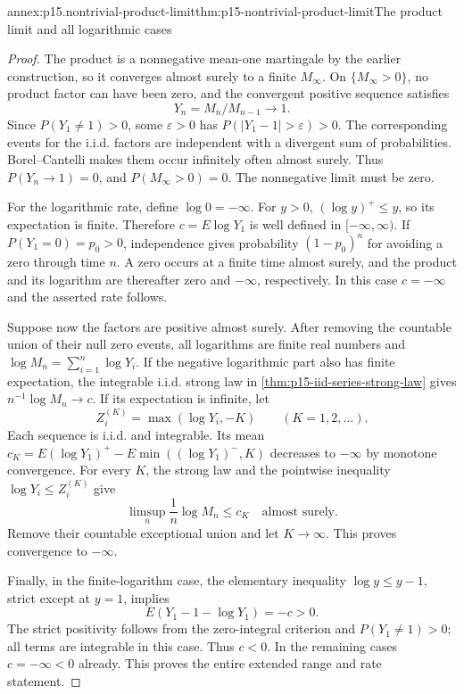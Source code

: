\begin{annexitem}{annex:p15.nontrivial-product-limit}{thm:p15-nontrivial-product-limit}{The product limit and all logarithmic cases}
\begin{proof}
The product is a nonnegative mean-one martingale by the earlier
construction, so it converges almost surely to a finite \(M_\infty\).
On \(\{M_\infty>0\}\), no product factor can have been zero,
and the convergent positive sequence satisfies
\[
                          Y_n=M_n/M_{n-1}\longrightarrow1.
\]
Since \(P(Y_1\ne1)>0\), some \(\varepsilon>0\) has
\(P(|Y_1-1|>\varepsilon)>0\).
The corresponding events for the i.i.d. factors are independent
with a divergent sum of probabilities.
Borel--Cantelli makes them occur infinitely often almost surely.
Thus \(P(Y_n\to1)=0\), and \(P(M_\infty>0)=0\).
The nonnegative limit must be zero.

For the logarithmic rate, define \(\log0=-\infty\).
For \(y>0\), \((\log y)^+\leq y\), so its expectation is finite.
Therefore \(c=E\log Y_1\) is well defined in \([-\infty,\infty)\).
If \(P(Y_1=0)=p_0>0\), independence gives probability
\((1-p_0)^n\) for avoiding a zero through time \(n\).
A zero occurs at a finite time almost surely, and the product
and its logarithm are thereafter zero and \(-\infty\), respectively.
In this case \(c=-\infty\) and the asserted rate follows.

Suppose now the factors are positive almost surely.
After removing the countable union of their null zero events,
all logarithms are finite real numbers and
\(\log M_n=\sum_{i=1}^n\log Y_i\).
If the negative logarithmic part also has finite expectation,
the integrable i.i.d. strong law in \cref{thm:p15-iid-series-strong-law} gives
\(n^{-1}\log M_n\to c\).
If its expectation is infinite, let
\[
                         Z_i^{(K)}=\max(\log Y_i,-K)
                                           \qquad(K=1,2,\ldots).
\]
Each sequence is i.i.d. and integrable.
Its mean \(c_K=E(\log Y_1)^+-E\min((\log Y_1)^-,K)\)
decreases to \(-\infty\) by monotone convergence.
For every \(K\), the strong law and the pointwise inequality
\(\log Y_i\leq Z_i^{(K)}\) give
\[
                    \limsup_n\frac1n\log M_n\leq c_K
                                         \quad\text{almost surely}.
\]
Remove their countable exceptional union and let \(K\to\infty\).
This proves convergence to \(-\infty\).

Finally, in the finite-logarithm case, the elementary inequality
\(\log y\leq y-1\), strict except at \(y=1\), implies
\[
                       E(Y_1-1-\log Y_1)=-c>0.
\]
The strict positivity follows from the zero-integral criterion
and \(P(Y_1\ne1)>0\); all terms are integrable in this case.
Thus \(c<0\). In the remaining cases \(c=-\infty<0\) already.
This proves the entire extended range and rate statement.
\end{proof}
\end{annexitem}

